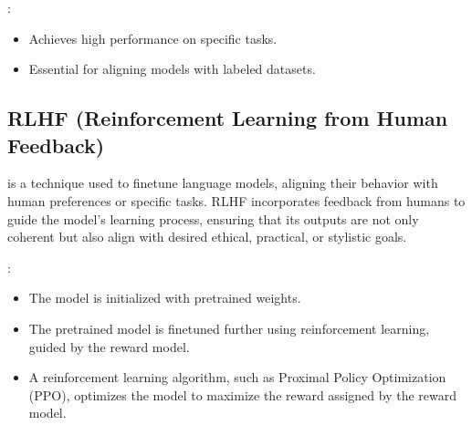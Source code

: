 \documentclass[letterpaper,11pt,english]{sphinxmanual}
\begin{document}
\sphinxAtStartPar
{}:
\begin{itemize}
\item {} 
\sphinxAtStartPar
Achieves high performance on specific tasks.

\item {} 
\sphinxAtStartPar
Essential for aligning models with labeled datasets.

\end{itemize}


\subsection{RLHF (Reinforcement Learning from Human Feedback)}
\label{\detokenize{finetuning:rlhf-reinforcement-learning-from-human-feedback}}
\sphinxAtStartPar
{} is a technique used to fine\sphinxhyphen{}tune language models, aligning their
behavior with human preferences or specific tasks. RLHF incorporates feedback
from humans to guide the model’s learning process, ensuring that its outputs
are not only coherent but also align with desired ethical, practical, or
stylistic goals.

\sphinxAtStartPar
{}:
\begin{itemize}
\item {} 
\sphinxAtStartPar
The model is initialized with pre\sphinxhyphen{}trained weights.

\item {} 
\sphinxAtStartPar
The pretrained model is fine\sphinxhyphen{}tuned further using reinforcement learning,
guided by the reward model.

\item {} 
\sphinxAtStartPar
A reinforcement learning algorithm, such as Proximal Policy Optimization
(PPO), optimizes the model to maximize the reward assigned by the reward model.

\end{itemize}
\end{document}
